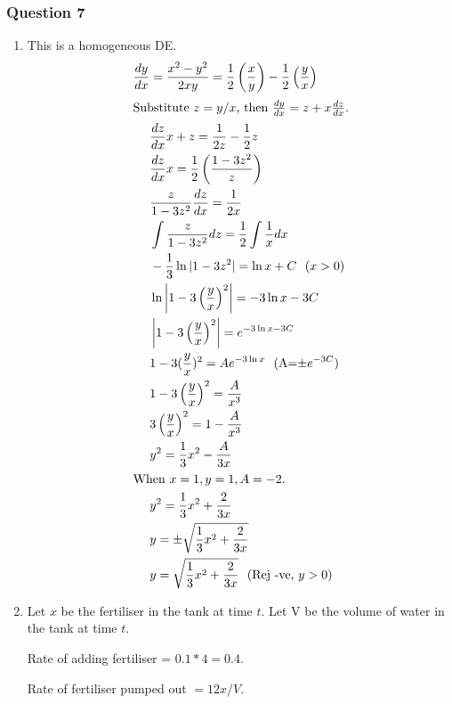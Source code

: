 \documentclass{article}
\begin{document}
\subsubsection*{Question 7}
\begin{enumerate}[label=\alph*)]
\item This is a homogeneous DE.
\begin{align*}
    \frac{dy}{dx}&=\frac{x^2-y^2}{2xy}=\frac{1}{2}\left(\frac{x}{y}\right)-\frac{1}{2}\left(\frac{y}{x}\right) \\
    \intertext{Substitute $z=y/x$, then $\frac{dy}{dx}=z+x\frac{dz}{dx}$.}
    &\frac{dz}{dx}x+z=\frac{1}{2z}-\frac{1}{2}z\\
    &\frac{dz}{dx}x=\frac{1}{2}\left(\frac{1-3z^2}{z}\right)\\
    &\frac{z}{1-3z^2}\frac{dz}{dx}=\frac{1}{2x}\\
    &\int\frac{z}{1-3z^2}dz=\frac{1}{2}\int\frac{1}{x}dx\\
    &-\frac{1}{3}\ln|1-3z^2|=\ln{x} + C \ \ \text{($x>0$)}\\
    &\ln\left|1-3\left(\frac{y}{x}\right)^2\right|=-3\ln{x} -3C \\
    &\left|1-3\left(\frac{y}{x}\right)^2\right| = e^{-3\ln{x}-3C}\\
    &1-3(\frac{y}{x})^2= Ae^{-3\ln{x}} \ \ \text{(A=$\pm e^{-3C}$)}\\
    &1-3\left(\frac{y}{x}\right)^2=\frac{A}{x^3}\\
    &3\left(\frac{y}{x}\right)^2=1-\frac{A}{x^3}\\
    &y^2 = \frac{1}{3}x^2-\frac{A}{3x}\\
\intertext{When $x=1,y=1, A=-2$.}
    &y^2=\frac{1}{3}x^2+\frac{2}{3x}\\
    &y=\pm \sqrt{\frac{1}{3}x^2+\frac{2}{3x}}\\
    &y=\sqrt{\frac{1}{3}x^2+\frac{2}{3x}} \ \ \text{(Rej -ve, $y>0$)}
\end{align*}

\item Let $x$ be the fertiliser in the tank at time $t$. Let V be the volume of water in the tank at time $t$.

Rate of adding fertiliser = $0.1*4 = 0.4$.

Rate of fertiliser pumped out $=12x/V$.


\end{enumerate}
\end{document}
